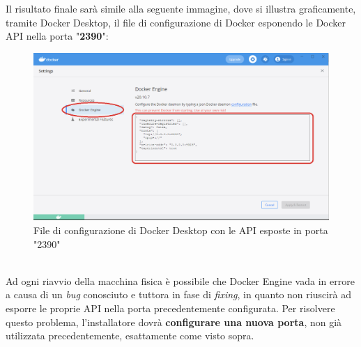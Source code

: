 Il risultato finale sarà simile alla seguente immagine, dove si illustra graficamente, tramite Docker Desktop, il file di configurazione di Docker esponendo le Docker API nella porta "\textbf{2390}":
\begin{figure}[!h]     
\centering 
    \includegraphics[width=0.65 \columnwidth]{immagini/img/docker_desktop_conf} 
    \caption{File di configurazione di Docker Desktop con le API esposte in porta "2390"}
\end{figure}\\
Ad ogni riavvio della macchina fisica è possibile che Docker Engine vada in errore a causa di un \textit{bug} conosciuto e tuttora in fase di \textit{fixing}, in quanto non riuscirà ad esporre le proprie API nella porta precedentemente configurata. Per risolvere questo problema, l'installatore dovrà \textbf{configurare una nuova porta}, non già utilizzata precedentemente, esattamente come visto sopra.\\










